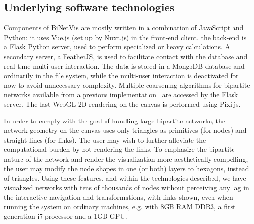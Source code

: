 \documentclass[runningheads]{llncs}
\begin{document}
\subsection{Underlying software technologies}
Components of BiNetVis are mostly written in a combination of JavaScript and Python: it uses Vue.js (set up by Nuxt.js) in the front-end client, the back-end is a Flask Python server, used to perform specialized or heavy calculations.
A secondary server, a FeatherJS, is used to facilitate contact with the database and real-time multi-user interaction.
The data is stored in a MongoDB database and ordinarily in the file system,
while the multi-user interaction is deactivated for now to avoid unnecessary complexity.
Multiple coarsening algorithms for bipartite networks available from a previous implementation~\cite{alan2} are accessed by the Flask server.
The fast WebGL 2D rendering on the canvas is performed using Pixi.js.

In order to comply with the goal of handling large bipartite networks, the network geometry on the canvas uses only triangles as primitives (for nodes) and straight lines (for links).
The user may wish to further alleviate the computational burden by not rendering the links.
To emphasize the bipartite nature of the network and render the visualization more aesthetically compelling, the user may modify the node shapes in one (or both) layers to hexagons, instead of triangles.
Using these features, and within the technologies described, we have visualized networks
with tens of thousands of nodes without perceiving any lag in the interactive navigation and transformations,
with links shown,
even when running the system on ordinary machines, e.g. with 8GB RAM DDR3, a first generation i7 processor and a 1GB GPU.


\end{document}
